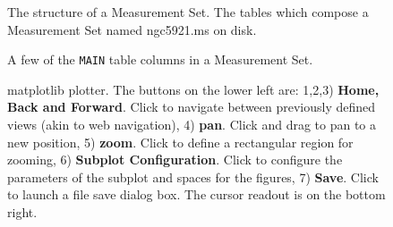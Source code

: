 \begin{figure}[h!]
\caption{\label{fig:tablekeyword} The structure of a Measurement
  Set. The tables which compose a Measurement Set named ngc5921.ms on
  disk.}
\hrulefill
\end{figure}
 
\begin{figure}[h!]
\caption{\label{fig:tablekeyword2} A few of the {\tt MAIN} table columns in a
  Measurement Set.} 
\hrulefill
\end{figure}
 
\begin{figure}[h!]
\caption{\label{fig:matplotlib2} matplotlib plotter. The buttons on the
  lower left are: 1,2,3) {\bf Home, Back and Forward}. Click to navigate
  between previously defined views (akin to web navigation), 4)
  {\bf pan}. Click and drag to pan to a new position, 5) {\bf zoom}. Click to
  define a rectangular region for zooming, 6) {\bf Subplot
  Configuration}. Click to configure the parameters of the subplot and
  spaces for the figures, 7) {\bf Save}. Click to launch a file save
  dialog box. The cursor readout is on the bottom right.}
\hrulefill
\end{figure}

